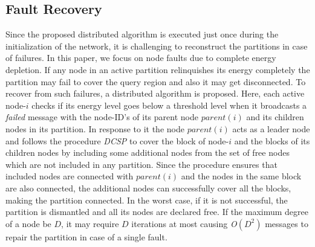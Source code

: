 \documentclass{acm_proc_article-sp}
\begin{document}
\subsection{Fault Recovery}
Since the proposed distributed algorithm is executed just once during the initialization of the network, it is challenging to reconstruct the partitions in case of failures. In this paper, we focus on node faults due to complete energy depletion. If any node in an active partition relinquishes its energy completely the partition may fail to cover the query region and also it may get disconnected. To recover from such failures, a distributed algorithm is proposed. Here, each active node-$i$ checks if its energy level goes below a threshold level when it broadcasts a {\it failed} message with the node-ID's of its parent node $parent(i)$ and its children nodes in its partition. In response to it the node $parent(i)$ acts as a leader node and follows the procedure {\it DCSP} to cover the block of node-$i$ and the blocks of its children nodes by including some additional nodes from the set of free nodes which are not included in any partition.
Since the procedure ensures that included nodes are connected with $parent(i)$ and the nodes in the same block are also connected, the additional nodes can successfully cover all the blocks, making the partition connected. In the worst case, if it is not successful, the partition is dismantled and all its nodes are declared free. If the maximum degree of a node be $D$, it may require $D$ iterations at most causing {\it O$(D^2)$} messages to repair the partition in case of a single fault.
\end{document}

